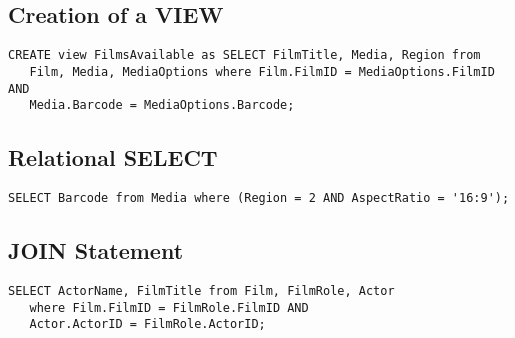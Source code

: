 \documentclass[a4paper,12pt]{article}
\begin{document}
\subsection{Creation of a VIEW}

\begin{verbatim}
CREATE view FilmsAvailable as SELECT FilmTitle, Media, Region from
   Film, Media, MediaOptions where Film.FilmID = MediaOptions.FilmID AND
   Media.Barcode = MediaOptions.Barcode;
\end{verbatim}

\subsection{Relational SELECT}

\begin{verbatim}
SELECT Barcode from Media where (Region = 2 AND AspectRatio = '16:9');
\end{verbatim}

\subsection{JOIN Statement}

\begin{verbatim}
SELECT ActorName, FilmTitle from Film, FilmRole, Actor
   where Film.FilmID = FilmRole.FilmID AND
   Actor.ActorID = FilmRole.ActorID;
\end{verbatim}
\end{document}
